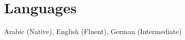 \documentclass[11pt,a4paper,sans]{moderncv}
\begin{document}

\section{Languages}
Arabic (Native), English (Fluent), German (Intermediate)
\end{document}
